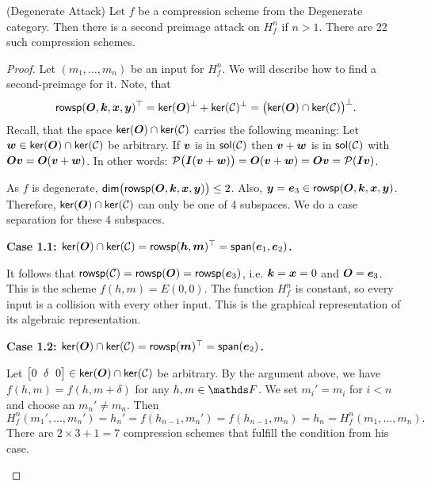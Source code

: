 \begin{lemma}(Degenerate Attack)
    Let $f$ be a compression scheme from the Degenerate category.
    Then there is a second preimage attack on $H^n_f$ if $n>1$.
    There are 22 such compression schemes.
\end{lemma}
\begin{proof}
Let $(m_1, \dots, m_n)$ be an input for $H^n_f$.
We will describe how to find a second-preimage for it.
Note, that 
\[
\mathsf{rowsp}(\boldsymbol{O}, \boldsymbol k, \boldsymbol x, \boldsymbol y)^\top = \mathsf{ker}(\boldsymbol{O})^\perp + \mathsf{ker}(\mathcal{C})^\perp = \big(\mathsf{ker}(\boldsymbol{O}) \cap \mathsf{ker}(\mathcal{C})\big)^\perp.
\] 
Recall, that the space $\mathsf{ker}(\boldsymbol{O}) \cap \mathsf{ker}(\mathcal{C})$ carries the following meaning:
Let $\boldsymbol w \in \mathsf{ker}(\boldsymbol{O}) \cap \mathsf{ker}(\mathcal{C})$ be arbitrary.
If $\boldsymbol v$ is in $\mathsf{sol}(\mathcal{C})$ then $\boldsymbol v + \boldsymbol w$ is in $\mathsf{sol}(\mathcal{C})$ with $\boldsymbol{O}\boldsymbol v = \boldsymbol{O}(\boldsymbol v + \boldsymbol w)$.
In other words: $\mathcal{P}\big(\boldsymbol{I}(\boldsymbol v + \boldsymbol w)\big) = \boldsymbol{O}(\boldsymbol v + \boldsymbol w) = \boldsymbol{O}\boldsymbol v = \mathcal{P}(\boldsymbol{I}\boldsymbol v)$.

As $f$ is degenerate, $\mathsf{dim}\big(\mathsf{rowsp}(\boldsymbol{O},\boldsymbol k,\boldsymbol x,\boldsymbol y)\big) \leq 2$.
Also, $\boldsymbol y = \boldsymbol e_3 \in \mathsf{rowsp}(\boldsymbol{O}, \boldsymbol k, \boldsymbol x, \boldsymbol y)$.
Therefore, $\mathsf{ker}(\boldsymbol{O}) \cap \mathsf{ker}(\mathcal{C})$ can only be one of 4 subspaces.
We do a case separation for these 4 subspaces.

\textbf{Case 1.1: $\mathsf{ker}(\boldsymbol{O}) \cap \mathsf{ker}(\mathcal{C}) = \mathsf{rowsp}(\boldsymbol h, \boldsymbol m)^\top = \mathsf{span}(\boldsymbol e_1, \boldsymbol e_2)$.}

It follows that $\mathsf{rowsp}(\mathcal{C}) = \mathsf{rowsp}(\boldsymbol{O}) = \mathsf{rowsp}(\boldsymbol e_3)$, i.e. $\boldsymbol k = \boldsymbol x = 0$ and $\boldsymbol{O} = \boldsymbol e_3$.
This is the scheme $f(h,m) = E(0,0)$.
The function $H^n_f$ is constant, so every input is a collision with every other input.
This is the graphical representation of its algebraic representation.
\begin{center}
\centering
{}
\end{center}

\textbf{Case 1.2: $\mathsf{ker}(\boldsymbol{O}) \cap \mathsf{ker}(\mathcal{C}) = \mathsf{rowsp}(\boldsymbol m)^\top = \mathsf{span}(\boldsymbol e_2)$.}

Let $\m{0&\delta&0} \in \ker(\O) \cap \ker(\C)$ be arbitrary.
By the argument above, we have $f(h,m) = f(h,m + \delta)$ for any $h, m \in \F$.
We set $m_i' = m_i$ for $i<n$ and choose an $m_n' \neq m_n$.
Then 
\[
H^n_f(m_1', \dots, m_n') = h_n' = f(h_{n-1}, m_n') = f(h_{n-1}, m_n) = h_n = H^n_f(m_1, \dots, m_n).
\]
There are $2 \times 3 + 1 = 7$ compression schemes that fulfill the condition from his case.
\begin{center}
\end{center}


\end{proof}
